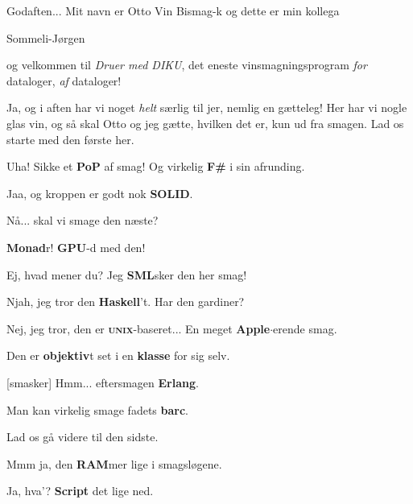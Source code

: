 \documentclass{article}
\begin{document}
\newpage%
\begin{sketch}



 Godaften... Mit navn er Otto Vin Bismag-k og dette er min kollega 

 Sommeli-Jørgen

 og velkommen til \emph{Druer med DIKU}, det eneste vinsmagningsprogram \emph{for} dataloger, \emph{af} dataloger! 

 Ja, og i aften har vi noget \emph{helt} særlig til jer, nemlig en gætteleg! Her har vi nogle glas vin, og så skal Otto og jeg gætte, hvilken det er, kun ud fra smagen. Lad os starte med den første her.


 Uha! Sikke et \textbf{PoP} af smag! Og virkelig \textbf{F\#} i sin afrunding.

 Jaa, og kroppen er godt nok \textbf{SOLID}.

 Nå... skal vi smage den næste?


 \textbf{Monad}r! \textbf{GPU}-d med den!

 Ej, hvad mener du? Jeg \textbf{SML}sker den her smag!

 Njah, jeg tror den \textbf{Haskell}'t. Har den gardiner?

 Nej, jeg tror, den er \textbf{\textsc{unix}}-baseret... En meget \textbf{Apple}$\cdot$erende smag.

 Den er \textbf{objektiv}t set i en \textbf{klasse} for sig selv. 

[smasker] Hmm... eftersmagen \textbf{Erlang}.

 Man kan virkelig smage fadets \textbf{barc}. %

 Lad os gå videre til den sidste.


 Mmm ja, den \textbf{RAM}mer lige i smagsløgene.

 Ja, hva'? \textbf{Script} det lige ned.


\end{sketch}
\end{document}

